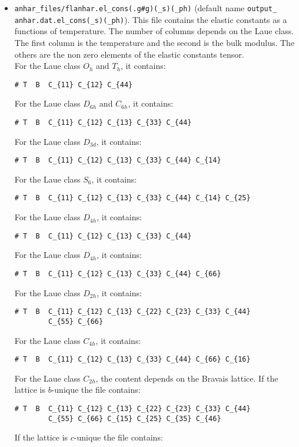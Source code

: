 \documentclass[12pt,a4paper,twoside]{report}
\begin{document}
\begin{itemize}
\item
\texttt{anhar\_files/flanhar.el\_cons(.g\#g)(\_s)(\_ph)}
(default name \texttt{output\_} \texttt{anhar.dat.el\_cons(\_s)(\_ph)}). 
This file
contains the elastic constants as a functions of temperature. The number
of columns depends on the Laue class. The first column is the 
temperature and the second is the bulk modulus. The others are the
non zero elements of the elastic constants tensor. \\ 
For the Laue class $O_h$ and $T_h$, it contains:
\begin{verbatim}
# T  B  C_{11} C_{12} C_{44}   
\end{verbatim}
For the Laue class $D_{6h}$ and $C_{6h}$, it contains:
\begin{verbatim}
# T  B  C_{11} C_{12} C_{13} C_{33} C_{44}  
\end{verbatim}
For the Laue class $D_{3d}$, it contains:
\begin{verbatim}
# T  B  C_{11} C_{12} C_{13} C_{33} C_{44} C_{14}  
\end{verbatim}
For the Laue class $S_{6}$, it contains:
\begin{verbatim}
# T  B  C_{11} C_{12} C_{13} C_{33} C_{44} C_{14} C_{25}  
\end{verbatim}
For the Laue class $D_{4h}$, it contains:
\begin{verbatim}
# T  B  C_{11} C_{12} C_{13} C_{33} C_{44}  
\end{verbatim}
For the Laue class $D_{4h}$, it contains:
\begin{verbatim}
# T  B  C_{11} C_{12} C_{13} C_{33} C_{44} C_{66} 
\end{verbatim}
For the Laue class $D_{2h}$, it contains:
\begin{verbatim}
# T  B  C_{11} C_{12} C_{13} C_{22} C_{23} C_{33} C_{44} 
        C_{55} C_{66}
\end{verbatim}
For the Laue class $C_{4h}$, it contains:
\begin{verbatim}
# T  B  C_{11} C_{12} C_{13} C_{33} C_{44} C_{66} C_{16}  
\end{verbatim}
For the Laue class $C_{2h}$, the content depends on the Bravais lattice. 
If the lattice is $b$-unique the file contains:
\begin{verbatim}
# T  B  C_{11} C_{12} C_{13} C_{22} C_{23} C_{33} C_{44} 
        C_{55} C_{66} C_{15} C_{25} C_{35} C_{46} 
\end{verbatim}
If the lattice is $c$-unique the file contains:
\begin{verbatim}

\end{verbatim}
\end{itemize}
\end{document}
